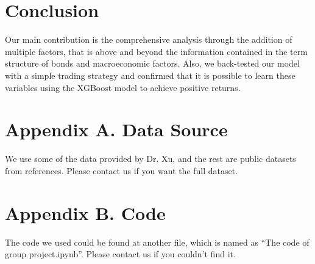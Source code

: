 \documentclass[12pt]{article}
\begin{document}
\section{Conclusion}
Our main contribution is the comprehensive analysis through the addition of multiple factors, that is above and beyond the information contained in the term structure of bonds and macroeconomic factors. Also, we back-tested our model with a simple trading strategy and confirmed that it is possible to learn these variables using the XGBoost model to achieve positive returns.

\newpage

 


\newpage

\appendix
\section*{Appendix A. Data Source}
We use some of the data provided by Dr. Xu, and the rest are public datasets from references. Please contact us if you want the full dataset.

\section*{Appendix B. Code}
The code we used could be found at another file, which is named as “The code of group project.ipynb”. Please contact us if you couldn't find it.

\end{document}
